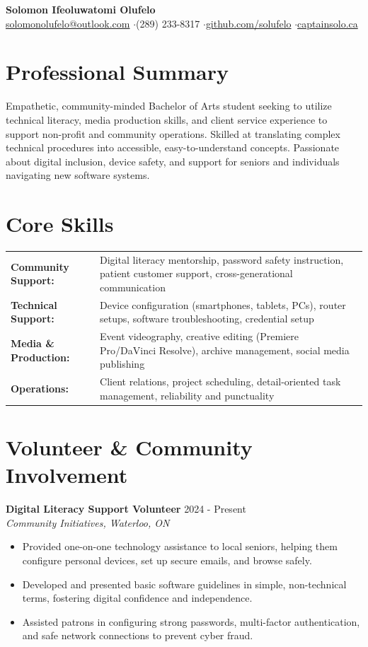 \documentclass[a4paper,10pt]{article}
\begin{document}
\begin{center}
    {\LARGE \textbf{Solomon Ifeoluwatomi Olufelo}} \\[2pt]
    \href{mailto:solomonolufelo@outlook.com}{solomonolufelo@outlook.com} \enspace$\cdot$\enspace (289) 233-8317 \enspace$\cdot$\enspace \href{https://github.com/solufelo}{github.com/solufelo} \enspace$\cdot$\enspace \href{https://captainsolo.ca}{captainsolo.ca}
\end{center}

\section*{Professional Summary}
Empathetic, community-minded Bachelor of Arts student seeking to utilize technical literacy, media production skills, and client service experience to support non-profit and community operations. Skilled at translating complex technical procedures into accessible, easy-to-understand concepts. Passionate about digital inclusion, device safety, and support for seniors and individuals navigating new software systems.

\section*{Core Skills}
\begin{tabularx}{\textwidth}{@{}lX@{}}
\textbf{Community Support:} & Digital literacy mentorship, password safety instruction, patient customer support, cross-generational communication \\
\textbf{Technical Support:} & Device configuration (smartphones, tablets, PCs), router setups, software troubleshooting, credential setup \\
\textbf{Media \& Production:} & Event videography, creative editing (Premiere Pro/DaVinci Resolve), archive management, social media publishing \\
\textbf{Operations:} & Client relations, project scheduling, detail-oriented task management, reliability and punctuality \\
\end{tabularx}

\section*{Volunteer \& Community Involvement}
\textbf{Digital Literacy Support Volunteer} \hfill 2024 - Present \\
\textit{Community Initiatives, Waterloo, ON}
\begin{itemize}
    \item Provided one-on-one technology assistance to local seniors, helping them configure personal devices, set up secure emails, and browse safely.
    \item Developed and presented basic software guidelines in simple, non-technical terms, fostering digital confidence and independence.
    \item Assisted patrons in configuring strong passwords, multi-factor authentication, and safe network connections to prevent cyber fraud.
\end{itemize}
\end{document}
